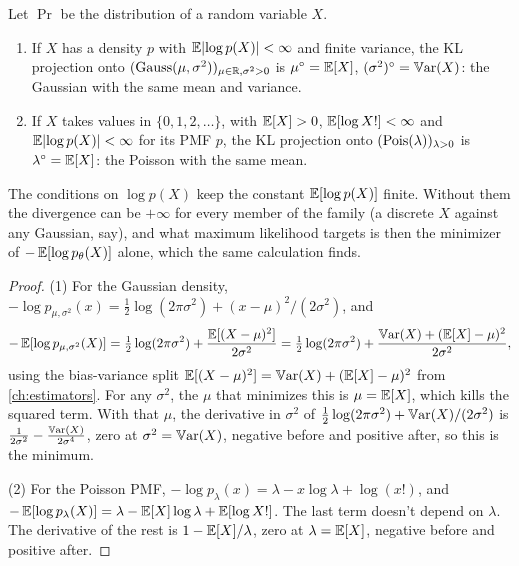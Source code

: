 \begin{proposition}
\label{prop:kl-projection}
Let $\Pr$ be the distribution of a random variable $X$.
\begin{enumerate}[nosep]
\item If $X$ has a density $p$ with $\operatorname*{\mathbb{E}}\lvert\log p(X)\rvert < \infty$ and finite variance, the KL projection onto $(\text{Gauss}(\mu, \sigma^2))_{\mu \in \mathbb{R}, \sigma^2 > 0}$ is $\mu^\circ = \operatorname*{\mathbb{E}}[X]$, $(\sigma^2)^\circ = \operatorname*{\mathbb{V}\text{ar}}(X)$: the Gaussian with the same mean and variance.
\item If $X$ takes values in $\{0, 1, 2, \ldots\}$, with $\operatorname*{\mathbb{E}}[X] > 0$, $\operatorname*{\mathbb{E}}[\log X!] < \infty$ and $\operatorname*{\mathbb{E}}\lvert\log p(X)\rvert < \infty$ for its PMF $p$, the KL projection onto $(\text{Pois}(\lambda))_{\lambda > 0}$ is $\lambda^\circ = \operatorname*{\mathbb{E}}[X]$: the Poisson with the same mean.
\end{enumerate}
\end{proposition}

The conditions on $\log p(X)$ keep the constant $\operatorname*{\mathbb{E}}[\log p(X)]$ finite. Without them the divergence can be $+\infty$ for every member of the family (a discrete $X$ against any Gaussian, say), and what maximum likelihood targets is then the minimizer of $-\operatorname*{\mathbb{E}}[\log p_\theta(X)]$ alone, which the same calculation finds.

\begin{proof}
(1) For the Gaussian density, $-\log p_{\mu, \sigma^2}(x) = \frac12 \log(2\pi\sigma^2) + (x - \mu)^2/(2\sigma^2)$, and
\[
-\operatorname*{\mathbb{E}}[\log p_{\mu,\sigma^2}(X)] = \tfrac12 \log(2\pi\sigma^2) + \frac{\operatorname*{\mathbb{E}}[(X - \mu)^2]}{2\sigma^2} = \tfrac12 \log(2\pi\sigma^2) + \frac{\operatorname*{\mathbb{V}\text{ar}}(X) + (\operatorname*{\mathbb{E}}[X] - \mu)^2}{2\sigma^2},
\]
using the bias-variance split $\operatorname*{\mathbb{E}}[(X - \mu)^2] = \operatorname*{\mathbb{V}\text{ar}}(X) + (\operatorname*{\mathbb{E}}[X] - \mu)^2$ from \cref{ch:estimators}.
For any $\sigma^2$, the $\mu$ that minimizes this is $\mu = \operatorname*{\mathbb{E}}[X]$, which kills the squared term.
With that $\mu$, the derivative in $\sigma^2$ of $\frac12\log(2\pi\sigma^2) + \operatorname*{\mathbb{V}\text{ar}}(X)/(2\sigma^2)$ is $\frac{1}{2\sigma^2} - \frac{\operatorname*{\mathbb{V}\text{ar}}(X)}{2\sigma^4}$, zero at $\sigma^2 = \operatorname*{\mathbb{V}\text{ar}}(X)$, negative before and positive after, so this is the minimum.

(2) For the Poisson PMF, $-\log p_\lambda(x) = \lambda - x\log\lambda + \log(x!)$, and $-\operatorname*{\mathbb{E}}[\log p_\lambda(X)] = \lambda - \operatorname*{\mathbb{E}}[X] \log\lambda + \operatorname*{\mathbb{E}}[\log X!]$.
The last term doesn't depend on $\lambda$.
The derivative of the rest is $1 - \operatorname*{\mathbb{E}}[X]/\lambda$, zero at $\lambda = \operatorname*{\mathbb{E}}[X]$, negative before and positive after.
\end{proof}

